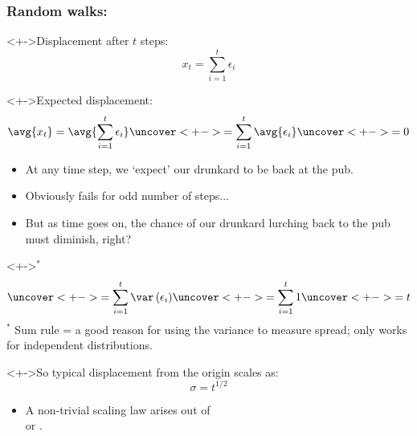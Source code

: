 \begin{frame}
  \frametitle{Random walks:}

  \begin{block}<+->{Displacement after $t$ steps:}
    $$x_t = \sum_{i=1}^{t} \epsilon_i$$  
  \end{block}

  \medskip

  \begin{block}<+->{Expected displacement:}
    $$
    \avg{x_t} = \avg{\sum_{i=1}^{t} \epsilon_i}
    \uncover<+->{= \sum_{i=1}^{t} \avg{\epsilon_i}}
    \uncover<+->{= 0}
    $$
    \begin{itemize}
    \item<+->
      At any time step, we `expect' our drunkard to be back at the pub.
    \item<+->
      Obviously fails for odd number of steps...
    \item<+->
      But as time goes on, the chance of our drunkard lurching back
      to the pub must diminish, right?
    \end{itemize}
  \end{block}

\end{frame}

\begin{frame}

  \begin{block}<+->{$^*$}
    $$
    \uncover<+->{= \sum_{i=1}^{t} \var\left(  \epsilon_i \right) }
    \uncover<+->{= \sum_{i=1}^{t} 1}
    \uncover<+->{= t }
    $$
    {\small $^*$ Sum rule = a good reason for using the variance to measure spread; 
      only works for independent distributions.}
  \end{block}

  \begin{block}<+->{So typical displacement from the origin scales as:}
    $$\boxed{\sigma = t^{1/2}}$$
    \begin{itemize}
    \item<+-> 
      A non-trivial scaling law arises out of\\
      \qquad {} or .
    \end{itemize}
  \end{block}
  
\end{frame}


